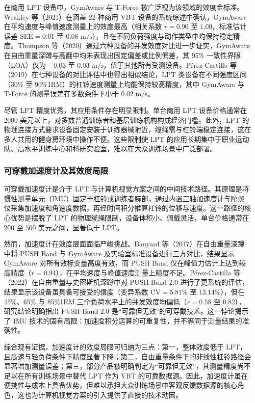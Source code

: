\documentclass[UTF8,zihao=-4,twoside,openany]{ctexbook}
\begin{document}
在商用 LPT 设备中，GymAware 与 T-Force 被广泛视为该领域的效度金标准。Weakley 等（2021）在涵盖 22 种商用 VBT 设备的系统综述中确认，GymAware 在平均速度与峰值速度测量上的效度最高（相关系数 $r=0.90$ 至 $1.00$，标准估计误差 $\text{SEE}=0.01$ 至 $0.08\text{ m/s}$），且在不同负荷强度与动作类型中均保持稳定精度。Thompson 等（2020）通过六种设备的并发效度对比进一步证实，GymAware 在自由重量深蹲与高翻中均未表现出固定偏差或比例偏差，其 95\% 一致性界限（LOA）仅为 $-0.03$ 至 $0.03\text{ m/s}$，优于其他所有受测设备。Pérez-Castilla 等（2019）在七种设备的对比评估中也得出相似结论，LPT 类设备在不同强度区间（30\% 至 90\%1RM）的杠铃速度测量上均能保持较高精度，其中 GymAware 与 T-Force 的测量误差在多数条件下小于 $0.02\text{ m/s}$。

尽管 LPT 精度优秀，其应用条件存在明显限制。单台商用 LPT 设备价格通常在 2000 美元以上，对多数普通训练者和基层训练机构构成经济门槛。此外，LPT 的物理连接方式要求设备固定安装于训练器械附近，缆绳需与杠铃端稳定连接，这在多人共用的健身房环境中操作不便。这些限制使 LPT 的应用长期集中于职业运动队、高水平训练中心和科研实验室，难以在大众训练场景中广泛部署。

\subsubsection{可穿戴加速度计及其效度局限}
可穿戴加速度计是介于 LPT 与计算机视觉方案之间的中间技术路径。其原理是将惯性测量单元（IMU）固定于杠铃或训练者腕部，通过内置三轴加速度计与陀螺仪采集加速度和角速度数据，再经时间积分推算杠铃的位移与速度。这一路径的核心优势是摆脱了 LPT 的物理缆绳限制，设备体积小、佩戴灵活，单台价格通常在 200 至 500 美元之间，显著低于 LPT。

然而，加速度计在效度层面面临严峻挑战。Banyard 等（2017）在自由重量深蹲中将 PUSH Band 与 GymAware 及实验室标准设备进行三方对比，结果显示 GymAware 对所有效标变量高度有效，而 PUSH Band 仅在峰值力估计上达到较高精度（$r=0.94$），在平均速度与峰值速度测量上精度不足。Pérez-Castilla 等（2022）在自由重量与史密斯机深蹲中对 PUSH Band 2.0 进行了更系统的评估，结果显示该设备虽具备可接受的信度（变异系数 $\text{CV}=5.81\%$ 至 $13.14\%$），但在 45\%、65\% 与 85\%1RM 三个负荷水平上的并发效度均偏低（$r=0.58$ 至 $0.82$），研究结论明确指出 PUSH Band 2.0 是“可靠但无效”的可穿戴技术。这一悖论揭示了 IMU 技术的固有局限：加速度积分运算的可重复性，并不等同于测量结果的准确性。

综合现有证据，加速度计的效度局限可归纳为三点：第一，整体效度低于 LPT，且高速与轻负荷条件下精度显著下降；第二，自由重量条件下的非线性杠铃路径会显著增加测量误差；第三，部分产品被明确判定为“可靠但无效”，其测量精度尚不足以在所有训练场景中替代 LPT 作为 VBT 的可靠数据源。因此，加速度计虽在便携性与成本上具备优势，但难以承担大众训练场景中客观反馈数据源的核心角色，这也为计算机视觉方案的引入提供了直接的技术动因。
\end{document}
